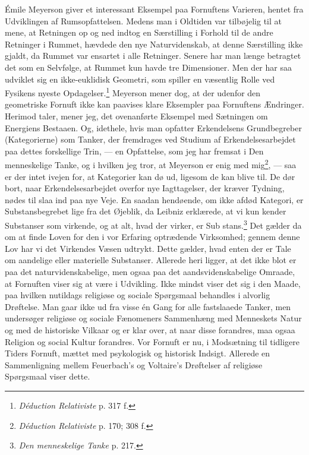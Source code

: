 \documentclass[12pt]{article}
\newcommand{\opage}[1]{\marginnote{\footnotesize\textit{[#1]}}}
\begin{document}
Émile Meyerson giver et interessant Eksempel paa \guillemotright{}Fornuftens\guillemotleft{}
Varieren, hentet fra Udviklingen af Rumsopfattelsen. Medens man i
Oldtiden var tilbøjelig til at mene, at Retningen \guillemotright{}op og ned\guillemotleft{} indtog en
Særstilling i Forhold til de andre Retninger i Rummet, hævdede den nye
Naturvidenskab, at denne Særstilling ikke gjaldt, da Rummet var
ensartet i alle Retninger. Senere har man længe betragtet det som en
Selvfølge, at Rummet kun havde tre Dimensioner. Men der har saa udviklet
sig en ikke-euklidisk Geometri, som spiller en væsentlig Rolle ved
Fysikens nyeste Opdagelser.\footnote{\textit{Déduction Relativiste}
p. 317 f.} Meyerson mener dog, at der udenfor den geometriske Fornuft
ikke kan paavises klare Eksempler paa \guillemotright{}Fornuftens\guillemotleft{} Ændringer. Herimod
taler, mener jeg, det ovenanførte Eksempel med Sætningen om Energiens
Bestaaen. Og, idethele, hvis man opfatter Erkendelsens Grundbegreber
(Kategorierne) som Tanker, der fremdrages ved Studium af
Erkendelsesarbejdet paa dettes forskellige Trin, --- en Opfattelse, som
jeg har fremsat i \guillemotright{}Den menneskelige Tanke\guillemotleft{}, og i hvilken jeg tror, at
Meyerson er enig med mig\footnote{\textit{Déduction Relativiste} p.
170; 308 f.}, --- saa er der intet ivejen for, at Kategorier kan dø ud,
ligesom de kan blive til. De dør bort, naar Erkendelsesarbejdet overfor
nye Iagttagelser, der kræver Tydning,
nødes til slaa ind paa nye Veje. En saadan hendøende, om ikke afdød
Kategori, er Substansbegrebet lige fra det Øjeblik, da Leibniz
erklærede, at vi kun kender Substanser som virkende, og at alt, hvad
der virker, er Sub%
\setcounter{footnote}{0}%
\opage{15}stans.\footnote{\textit{Den menneskelige Tanke} p. 217.} Det gælder da om at finde Loven for den i vor
Erfaring optrædende Virksomhed; gennem denne Lov har vi det
Virkendes Væsen udtrykt. Dette gælder, hvad enten der er Tale om
aandelige eller materielle Substanser. Allerede heri ligger, at det
ikke blot er paa det naturvidenskabelige, men ogsaa paa det
aandsvidenskabelige Omraade, at \guillemotright{}Fornuften\guillemotleft{} viser sig at være i
Udvikling. Ikke mindst viser det sig i den Maade, paa hvilken
nutildags religiøse og sociale Spørgsmaal behandles i alvorlig
Drøftelse. Man gaar ikke ud fra visse én Gang for alle fastslaaede
Tanker, men undersøger religiøse og sociale Fænomeners Sammenhæng med
Menneskets Natur og med de historiske Vilkaar og er klar over, at naar
disse forandres, maa ogsaa Religion og social Kultur forandres. Vor
\guillemotright{}Fornuft\guillemotleft{} er nu, i Modsætning til tidligere Tiders \guillemotright{}Fornuft\guillemotleft{}, mættet
med psykologisk og historisk Indsigt. Allerede en Sammenligning mellem
Feuerbach's og Voltaire's Drøftelser af religiøse Spørgsmaal viser
dette.
\end{document}
